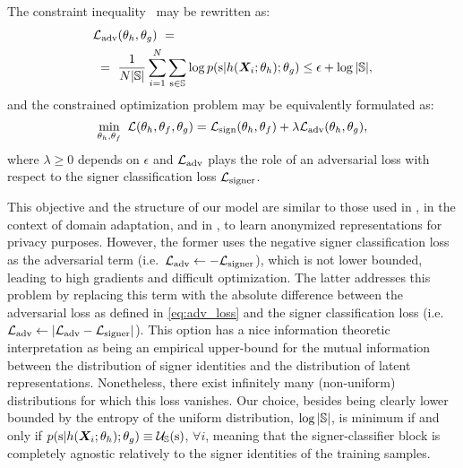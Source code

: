 The constraint inequality~ may be rewritten as:
\begin{align}
\label{eq:adv_loss}
&{\mathcal{L}}_{\text{adv}}(\theta_h, \theta_g)~=~\nonumber\\
&~=~\frac{1}{N|{\mathbb{S}}|}\sum_{i=1}^N \sum_{{\textnormal{s}} \in {\mathbb{S}}} \log p({\textnormal{s}} | h({\bm{X}}_{i}; \theta_h); \theta_g) \leq \epsilon + \log |{\mathbb{S}}|,
\end{align}
and the constrained optimization problem may be equivalently formulated as:
\begin{equation}
\label{eq:tr_obj}
\min_{\theta_h, \theta_f}~{\mathcal{L}}(\theta_h, \theta_f, \theta_g) = {\mathcal{L}}_{\text{sign}}(\theta_h, \theta_f) + \lambda {\mathcal{L}}_{\text{adv}}(\theta_h, \theta_g),
\end{equation}
where $\lambda \geq 0$ depends on $\epsilon$ and ${\mathcal{L}}_{\text{adv}}$ plays the role of an adversarial loss with respect to the signer classification loss ${\mathcal{L}}_{\text{signer}}$.

This objective and the structure of our model are similar to those used in \cite{Ganin2015}, in the context of domain adaptation, and in \cite{Feutry2018}, to learn anonymized representations for privacy purposes. However, the former uses the negative signer classification loss as the adversarial term (i.e.\ ${\mathcal{L}}_{\text{adv}} \leftarrow -{\mathcal{L}}_{\text{signer}}$), which is not lower bounded, leading to high gradients and difficult optimization. The latter addresses this problem by replacing this term with the absolute difference between the adversarial loss as defined in \eqref{eq:adv_loss} and the signer classification loss (i.e.\ ${\mathcal{L}}_{\text{adv}} \leftarrow |{\mathcal{L}}_{\text{adv}} - {\mathcal{L}}_{\text{signer}}|$). This option has a nice information theoretic interpretation as being an empirical upper-bound for the mutual information between the distribution of signer identities and the distribution of latent representations. Nonetheless, there exist infinitely many (non-uniform) distributions for which this loss vanishes. Our choice, besides being clearly lower bounded by the entropy of the uniform distribution, $\log |{\mathbb{S}}|$, is minimum if and only if $p({\textnormal{s}} | h({\bm{X}}_{i}; \theta_h); \theta_g) \equiv {\mathcal{U}}_{{\mathbb{S}}}({\textnormal{s}})$, $\forall i$, meaning that the signer-classifier block is completely agnostic relatively to the signer identities of the training samples.

